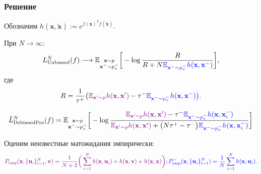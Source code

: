 \documentclass[
	11pt, %
]{beamer}
\begin{document}
\begin{frame}
    \frametitle{Решение}
\scriptsize
Обозначим $h(\textbf{x}, \widetilde{\textbf{x}}) := e^{f(\textbf{x})^T f(\widetilde{\textbf{x}})}$.

\begin{lemma}
При $N \to \infty$:
\begin{equation*}
L_{\text{Unbiased}}^N(f) 
\longrightarrow
\mathbb{E}_{\substack{\textbf{x} \sim p \\ \textbf{x}^- \sim p_x^-}} \bigg[ - \log \frac{R}{R + N \color{blue} \mathbb{E}_{\textbf{x}^- \sim p_x^-} h(\textbf{x}, \textbf{x}^-)}\bigg],
\end{equation*}
где
\begin{equation*}
R = \frac{1}{\tau^+} \big(\color{violet} \mathbb{E}_{\textbf{x}' \sim p} h(\textbf{x}, \textbf{x}') \color{black}  - \tau^- \color{blue} \mathbb{E}_{\textbf{x}^- \sim p_x^-} h(\textbf{x}, \textbf{x}^-)\big).
\end{equation*}
\end{lemma}

\begin{equation*}
\tilde{L}_{\text{DebiasedPos}}^N (f) = \mathbb{E}_{\substack{\textbf{x} \sim p \\ \textbf{x}^- \sim p_x^-}} \bigg[ - \log \frac{\color{violet} \mathbb{E}_{\textbf{x}' \sim p} h(\textbf{x}, \textbf{x}') \color{black} - \tau^- \color{blue} \mathbb{E}_{\textbf{x}^- \sim p_x^-} h(\textbf{x}, \textbf{x}_i^-)}{\color{violet} \mathbb{E}_{\textbf{x}' \sim p} h(\textbf{x}, \textbf{x}') \color{black} + \big(N \tau^+ - \tau^-\big) \color{blue} \mathbb{E}_{\textbf{x}^- \sim p_x^-} h(\textbf{x}, \textbf{x}_i^-)}\bigg]
\end{equation*}

Оценим неизвестные матожидания эмпирически:
\begin{equation*}
\color{violet}P_{\text{emp}} (\textbf{x}, \{\textbf{u}_i\}_{i=1}^N, \textbf{v}) = \frac{1}{N+2} \bigg(\sum \limits_{i=1}^N h(\textbf{x}, \textbf{u}_i) + h(\textbf{x}, \textbf{v}) + h(\textbf{x}, \textbf{x})\bigg)\color{black}; \color{blue} P_{\text{emp}}^- (\textbf{x}, \{\textbf{u}_i\}_{i=1}^N) = \frac{1}{N} \sum \limits_{i=1}^N h(\textbf{x}, \textbf{u}_i).
\end{equation*}

\end{frame}
\end{document}
